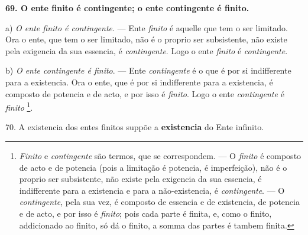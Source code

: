  \textbf{69. O ente finito é contingente; o ente contingente é finito.}

a) \emph{O ente finito é contingente}. --- Ente \emph{finito} é aquelle que tem o ser limitado. Ora o ente, que tem o ser limitado, não é o proprio ser subsistente, não existe pela exigencia da sua essencia, é \emph{contingente}. Logo o ente \emph{finito} é \emph{contingente}.

b) \emph{O ente contingente é finito}. --- Ente \emph{contingente} é o que é por si indifferente para a existencia. Ora o ente, que é por si indifferente para a existencia, é composto de potencia e de acto, e por isso é \emph{finito}. Logo o ente \emph{contingente} é \emph{finito} \footnote{\emph{Finito} e \emph{contingente} são termos, que se correspondem. --- O \emph{finito} é composto de acto e de potencia (pois a limitação é potencia, é imperfeição), não é o proprio ser subsistente, não existe pela exigencia da sua essencia, é indifferente para a existencia e para a não-existencia, é \emph{contingente}. --- O \emph{contingente}, pela sua vez, é composto de essencia e de existencia, de potencia e de acto, e por isso é \emph{finito}; pois cada parte é finita, e, como o finito, addicionado ao finito, só dá o finito, a somma das partes é tambem finita.}.

70. A existencia dos entes finitos suppõe a \textbf{existencia} do Ente infinito.

